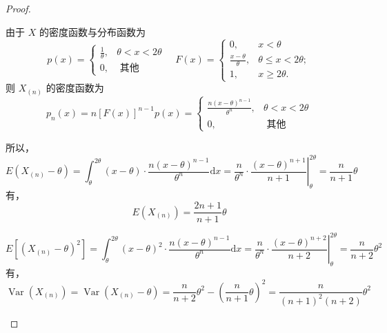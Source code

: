 \documentclass[normal,founder,mtpro2,cn]{elegantnote}
\begin{document}
\begin{enumerate}
\begin{proof}
\begin{enumerate}
                      由于 $X$ 的密度函数与分布函数为
                      \begin{equation*}
                          p(x)=\left\{\begin{array}{ll}
                              \frac{1}{\theta}, & \theta<x<2 \theta \\
                              0,                & \text { 其他 }
                          \end{array}\right.\quad
                          F(x)=\left\{\begin{array}{ll}0, & x<\theta \\ \frac{x-\theta}{\theta}, & \theta \leq x<2 \theta ; \\ 1, & x \geq 2 \theta .\end{array}\right.
                      \end{equation*}
                      则 $X_{(n)}$ 的密度函数为
                      \begin{equation*}
                          p_{n}(x)=n[F(x)]^{n-1}p(x)=\left\{\begin{array}{ll}
                              \frac{n(x-\theta)^{n-1}}{\theta^{n}}, & \theta<x<2 \theta \\
                              0,                                    & \text { 其他 }
                          \end{array}\right.
                      \end{equation*}

                      所以，
                      \begin{equation*}
                          E\left(X_{(n)}-\theta\right)=\int_{\theta}^{2\theta}(x-\theta)\cdot\frac{n(x-\theta)^{n-1}}{\theta^{n}}\mathrm{d}x=\left.\frac{n}{\theta^{n}}\cdot\frac{(x-\theta)^{n+1}}{n+1}\right|_{\theta}^{2\theta}=\frac{n}{n+1}\theta
                      \end{equation*}
                      有，
                      \begin{equation*}
                          E\left(X_{(n)}\right)=\frac{2 n+1}{n+1}\theta
                      \end{equation*}

                      \begin{equation*}
                          E\left[\left(X_{(n)}-\theta\right)^{2}\right]=\int_{\theta}^{2\theta}(x-\theta)^{2}\cdot\frac{n(x-\theta)^{n-1}}{\theta^{n}}\mathrm{d}x=\left.\frac{n}{\theta^{n}}\cdot\frac{(x-\theta)^{n+2}}{n+2}\right|_{\theta}^{2\theta}=\frac{n}{n+2}\theta^{2}
                      \end{equation*}
                      有，
                      \begin{equation*}
                          \operatorname{Var}\left(X_{(n)}\right)=\operatorname{Var}\left(X_{(n)}-\theta\right)=\frac{n}{n+2}\theta^{2}-\left(\frac{n}{n+1}\theta\right)^{2}=\frac{n}{(n+1)^{2}(n+2)}\theta^{2}
                      \end{equation*}


\end{enumerate}
\end{proof}
\end{enumerate}
\end{document}
